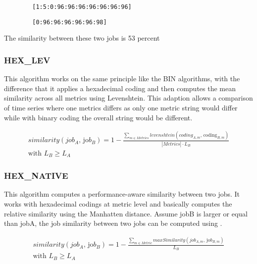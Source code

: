 \documentclass{jhps}
\begin{document}
\begin{listing}
	\noindent\begin{minipage}{0.49\textwidth}
		\begin{lstlisting}
		[1:5:0:96:96:96:96:96:96:96]
		\end{lstlisting}
		\vspace{-2em}
		\label{lst:sim:bin_aggzeros:job_a}
	\end{minipage}
	\noindent\begin{minipage}{0.49\textwidth}
		\begin{lstlisting}
		[0:96:96:96:96:96:98]
		\end{lstlisting}
		\vspace{-2em}
		\label{lst:sim:bin_aggzeros:job_b}
	\end{minipage}
	\caption{The similarity between these two jobs is 53 percent}
	\label{lst:sim:bin_aggzeros}
\end{listing}

\subsubsection{HEX\_LEV}
This algorithm works on the same principle like the BIN algorithms, with the difference that it applies a hexadecimal coding and then computes the mean similarity across all metrics using Levenshtein.
This adaption allows a comparison of time series where one metrics differs as only one metric string would differ while with binary coding the overall string would be different.

\begin{multline}
	similarity \left( job_{A}\text{, jo}b_{B} \right) = 1 -\frac{ \sum_{m \in Metrics}^{} levenshtein \left( coding_{A,m}\text{, coding}_{B,m} \right) }{|Metrics| \cdot L_{B}} \\
	\text{with } L_{B} \geq L_{A}
\end{multline}

\subsubsection{HEX\_NATIVE}
This algorithm computes a performance-aware similarity between two jobs.
It works with hexadecimal codings at metric level and basically computes the relative similarity using the Manhatten distance.
Assume jobB is larger or equal than jobA, the job similarity between two jobs can be computed using .

\begin{multline}
similarity \left( job_{A}\text{, jo}b_{B} \right) = 1-\frac{ \sum _{m \in Metric}^{}maxSimilarity \left( job_{A,m}\text{, jo}b_{B,m} \right) }{L_{B}}\\
\text{with }L_{B} \geq L_{A} \label{eq:hexn}
\end{multline}
\end{document}
